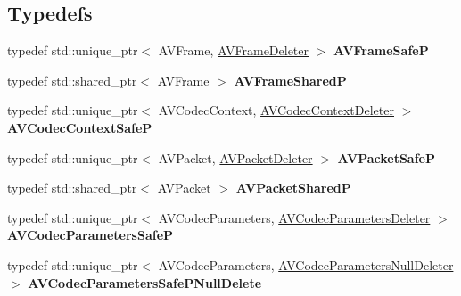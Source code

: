 \subsection*{Typedefs}
\begin{DoxyCompactItemize}
\item 
\mbox{\label{namespacemoetsi_1_1ssp_a5308ff28e01397d90471ba0def7e4966}} 
typedef std\+::unique\+\_\+ptr$<$ A\+V\+Frame, \hyperlink{structmoetsi_1_1ssp_1_1AVFrameDeleter}{A\+V\+Frame\+Deleter} $>$ {\bfseries A\+V\+Frame\+SafeP}
\item 
\mbox{\label{namespacemoetsi_1_1ssp_a85b9abfcf4a1ac5c7343b9e4a6a378d2}} 
typedef std\+::shared\+\_\+ptr$<$ A\+V\+Frame $>$ {\bfseries A\+V\+Frame\+SharedP}
\item 
\mbox{\label{namespacemoetsi_1_1ssp_a795275fdab2fe72f4a6398b66d8e5e08}} 
typedef std\+::unique\+\_\+ptr$<$ A\+V\+Codec\+Context, \hyperlink{structmoetsi_1_1ssp_1_1AVCodecContextDeleter}{A\+V\+Codec\+Context\+Deleter} $>$ {\bfseries A\+V\+Codec\+Context\+SafeP}
\item 
\mbox{\label{namespacemoetsi_1_1ssp_a38d0057d474e2ed9dc37f45e867f0f53}} 
typedef std\+::unique\+\_\+ptr$<$ A\+V\+Packet, \hyperlink{structmoetsi_1_1ssp_1_1AVPacketDeleter}{A\+V\+Packet\+Deleter} $>$ {\bfseries A\+V\+Packet\+SafeP}
\item 
\mbox{\label{namespacemoetsi_1_1ssp_a190e290a661acde0e12c743bda87f043}} 
typedef std\+::shared\+\_\+ptr$<$ A\+V\+Packet $>$ {\bfseries A\+V\+Packet\+SharedP}
\item 
\mbox{\label{namespacemoetsi_1_1ssp_a1e845774b692df7dd15cb05a0455b992}} 
typedef std\+::unique\+\_\+ptr$<$ A\+V\+Codec\+Parameters, \hyperlink{structmoetsi_1_1ssp_1_1AVCodecParametersDeleter}{A\+V\+Codec\+Parameters\+Deleter} $>$ {\bfseries A\+V\+Codec\+Parameters\+SafeP}
\item 
\mbox{\label{namespacemoetsi_1_1ssp_a536ad061fb3d6e87fa249cdfee336ece}} 
typedef std\+::unique\+\_\+ptr$<$ A\+V\+Codec\+Parameters, \hyperlink{structmoetsi_1_1ssp_1_1AVCodecParametersNullDeleter}{A\+V\+Codec\+Parameters\+Null\+Deleter} $>$ {\bfseries A\+V\+Codec\+Parameters\+Safe\+P\+Null\+Delete}

\end{DoxyCompactItemize}
